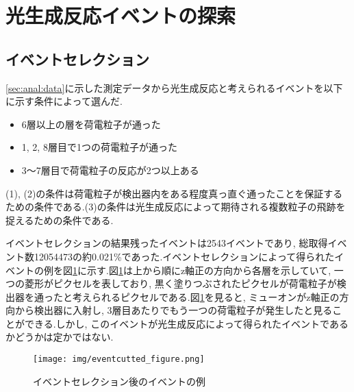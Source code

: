 \section{光生成反応イベントの探索}
\subsection{イベントセレクション}\label{sec:anal:eventcut}
\ref{sec:anal:data}に示した測定データから光生成反応と考えられるイベントを以下に示す条件によって選んだ.
\begin{itemize}
    \item[(1)] 6層以上の層を荷電粒子が通った
    \item[(2)] 1, 2, 8層目で1つの荷電粒子が通った
    \item[(3)] 3〜7層目で荷電粒子の反応が2つ以上ある
\end{itemize}
(1), (2)の条件は荷電粒子が検出器内をある程度真っ直ぐ通ったことを保証するための条件である.(3)の条件は光生成反応によって期待される複数粒子の飛跡を捉えるための条件である.

イベントセレクションの結果残ったイベントは2543イベントであり, 総取得イベント数12054473の約0.021\%であった.イベントセレクションによって得られたイベントの例を図\ref{fig:eventcuted_event}に示す.図\ref{fig:eventcuted_event}は上から順にz軸正の方向から各層を示していて, 一つの菱形がピクセルを表しており, 黒く塗りつぶされたピクセルが荷電粒子が検出器を通ったと考えられるピクセルである.図\ref{fig:eventcuted_event}を見ると, ミューオンがz軸正の方向から検出器に入射し, 3層目あたりでもう一つの荷電粒子が発生したと見ることができる.しかし, このイベントが光生成反応によって得られたイベントであるかどうかは定かではない.
\begin{figure}[H]
    \centering
    \texttt{[image: img/eventcutted\_figure.png]}
    \caption{イベントセレクション後のイベントの例}
    \label{fig:eventcuted_event}
\end{figure}

